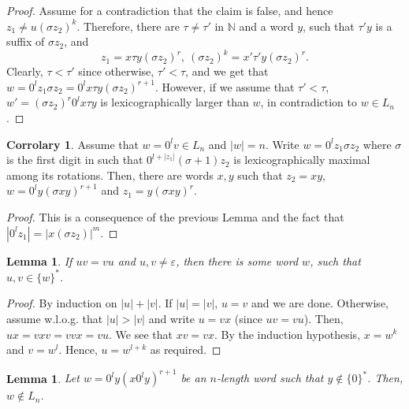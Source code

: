 \documentclass{article}
\newtheorem{lemma}[theorem]{Lemma}
\theoremstyle{definition}
\newtheorem{corrolary}[theorem]{Corrolary}
\newcommand{\N}{{\mathbb{N}}}
\begin{document}
\begin{proof}
Assume for a contradiction that the claim is false, and hence $z_1\neq u(\sigma z_2)^k$. Therefore, there are $\tau\neq \tau'$ in $\N$ and a word $y$, such that $\tau'y$ is a suffix of $\sigma z_2$, and 
$$z_1=x\tau y(\sigma z_2)^r, \ (\sigma z_2)^k= x'\tau' y(\sigma z_2)^r.$$
Clearly, $\tau<\tau'$ since otherwise, $\tau'<\tau$, and we get that 
$w=0^lz_1\sigma z_2=0^lx\tau y (\sigma z_2)^{r+1}$. However, if we assume that $\tau'<\tau$, $w'=(\sigma z_2)^r0^lx\tau y$ is lexicographically larger than $w$, in contradiction to $w\in L_n$.
\end{proof}

\begin{corrolary}
\label{z1-suffix}
Assume that $w=0^lv\in L_n$ and $|w|=n$. Write $w=0^lz_1\sigma z_2$ where $\sigma$ is the first digit in such that $0^{l+|z_1|}(\sigma+1)z_2$ is lexicographically maximal among its rotations. Then, there are words $x,y$ such that $z_2=xy$, $w=0^ly(\sigma xy)^{r+1}$ and $z_1=y(\sigma xy)^r$.
\end{corrolary}
\begin{proof}
 This is a consequence of the previous Lemma and the fact that $|0^lz_1|=|x(\sigma z_2)|^m$.
\end{proof}

\begin{lemma}
\label{concatenation}
If $uv=vu$ and $u,v\neq\varepsilon$, then there is some word $w$, such that $u,v\in\{w\}^*$.
\end{lemma}

\begin{proof}
By induction on $|u|+|v|$. If $|u|=|v|$, $u=v$ and we are done. Otherwise, assume w.l.o.g. that $|u|>|v|$ and write $u=vx$ (since $uv=vu$). Then, $ux=vxv=vvx=vu$. We see that $xv=vx$. By the induction hypothesis, $x=w^k$ and $v=w^l$. Hence, $u=w^{l+k}$ as required.
\end{proof}

\begin{lemma}
\label{not-in-Ln}
Let $w=0^ly(x0^ly)^{r+1}$ be an $n$-length word such that $y\notin \{0\}^*$. Then, $w\notin L_n$.
\end{lemma}
\end{document}
